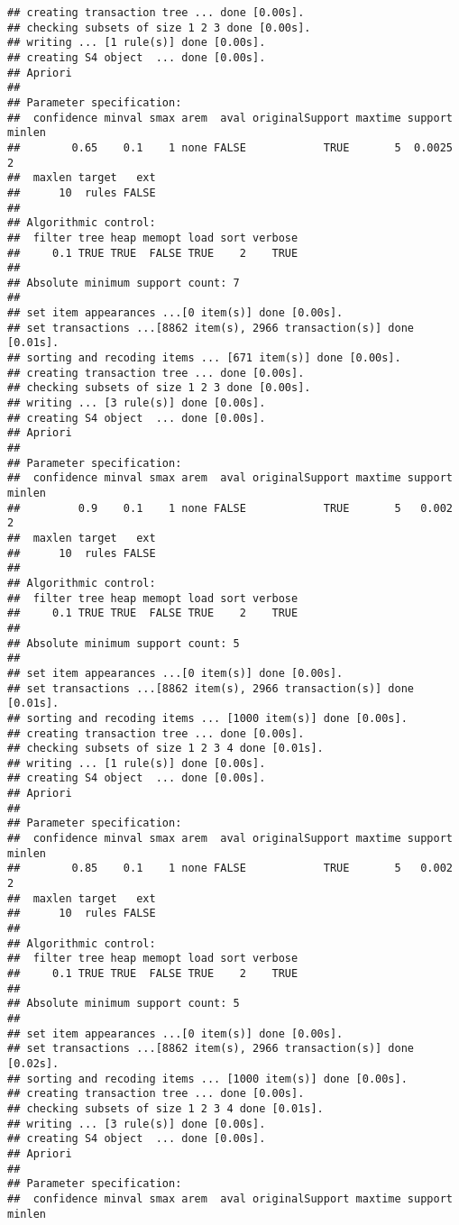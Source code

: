 \documentclass[]{article}
\begin{document}
\begin{verbatim}
## creating transaction tree ... done [0.00s].
## checking subsets of size 1 2 3 done [0.00s].
## writing ... [1 rule(s)] done [0.00s].
## creating S4 object  ... done [0.00s].
## Apriori
## 
## Parameter specification:
##  confidence minval smax arem  aval originalSupport maxtime support minlen
##        0.65    0.1    1 none FALSE            TRUE       5  0.0025      2
##  maxlen target   ext
##      10  rules FALSE
## 
## Algorithmic control:
##  filter tree heap memopt load sort verbose
##     0.1 TRUE TRUE  FALSE TRUE    2    TRUE
## 
## Absolute minimum support count: 7 
## 
## set item appearances ...[0 item(s)] done [0.00s].
## set transactions ...[8862 item(s), 2966 transaction(s)] done [0.01s].
## sorting and recoding items ... [671 item(s)] done [0.00s].
## creating transaction tree ... done [0.00s].
## checking subsets of size 1 2 3 done [0.00s].
## writing ... [3 rule(s)] done [0.00s].
## creating S4 object  ... done [0.00s].
## Apriori
## 
## Parameter specification:
##  confidence minval smax arem  aval originalSupport maxtime support minlen
##         0.9    0.1    1 none FALSE            TRUE       5   0.002      2
##  maxlen target   ext
##      10  rules FALSE
## 
## Algorithmic control:
##  filter tree heap memopt load sort verbose
##     0.1 TRUE TRUE  FALSE TRUE    2    TRUE
## 
## Absolute minimum support count: 5 
## 
## set item appearances ...[0 item(s)] done [0.00s].
## set transactions ...[8862 item(s), 2966 transaction(s)] done [0.01s].
## sorting and recoding items ... [1000 item(s)] done [0.00s].
## creating transaction tree ... done [0.00s].
## checking subsets of size 1 2 3 4 done [0.01s].
## writing ... [1 rule(s)] done [0.00s].
## creating S4 object  ... done [0.00s].
## Apriori
## 
## Parameter specification:
##  confidence minval smax arem  aval originalSupport maxtime support minlen
##        0.85    0.1    1 none FALSE            TRUE       5   0.002      2
##  maxlen target   ext
##      10  rules FALSE
## 
## Algorithmic control:
##  filter tree heap memopt load sort verbose
##     0.1 TRUE TRUE  FALSE TRUE    2    TRUE
## 
## Absolute minimum support count: 5 
## 
## set item appearances ...[0 item(s)] done [0.00s].
## set transactions ...[8862 item(s), 2966 transaction(s)] done [0.02s].
## sorting and recoding items ... [1000 item(s)] done [0.00s].
## creating transaction tree ... done [0.00s].
## checking subsets of size 1 2 3 4 done [0.01s].
## writing ... [3 rule(s)] done [0.00s].
## creating S4 object  ... done [0.00s].
## Apriori
## 
## Parameter specification:
##  confidence minval smax arem  aval originalSupport maxtime support minlen

\end{verbatim}
\end{document}
